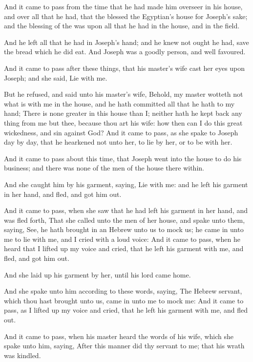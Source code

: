 \verse And it came to pass from the time that he had made him overseer in his house, and over all that he had, that the \LORD blessed the Egyptian's house for Joseph's sake; and the blessing of the \LORD was upon all that he had in the house, and in the field.

\verse And he left all that he had in Joseph's hand; and he knew not ought he had, save the bread which he did eat. And Joseph was a goodly person, and well favoured.

\verse And it came to pass after these things, that his master's wife cast her eyes upon Joseph; and she said, Lie with me.

\verse But he refused, and said unto his master's wife, Behold, my master wotteth not what is with me in the house, and he hath committed all that he hath to my hand; \verse There is none greater in this house than I; neither hath he kept back any thing from me but thee, because thou art his wife: how then can I do this great wickedness, and sin against God?  \verse And it came to pass, as she spake to Joseph day by day, that he hearkened not unto her, to lie by her, or to be with her.

\verse And it came to pass about this time, that Joseph went into the house to do his business; and there was none of the men of the house there within.

\verse And she caught him by his garment, saying, Lie with me: and he left his garment in her hand, and fled, and got him out.

\verse And it came to pass, when she saw that he had left his garment in her hand, and was fled forth, \verse That she called unto the men of her house, and spake unto them, saying, See, he hath brought in an Hebrew unto us to mock us; he came in unto me to lie with me, and I cried with a loud voice: \verse And it came to pass, when he heard that I lifted up my voice and cried, that he left his garment with me, and fled, and got him out.

\verse And she laid up his garment by her, until his lord came home.

\verse And she spake unto him according to these words, saying, The Hebrew servant, which thou hast brought unto us, came in unto me to mock me: \verse And it came to pass, as I lifted up my voice and cried, that he left his garment with me, and fled out.

\verse And it came to pass, when his master heard the words of his wife, which she spake unto him, saying, After this manner did thy servant to me; that his wrath was kindled.

